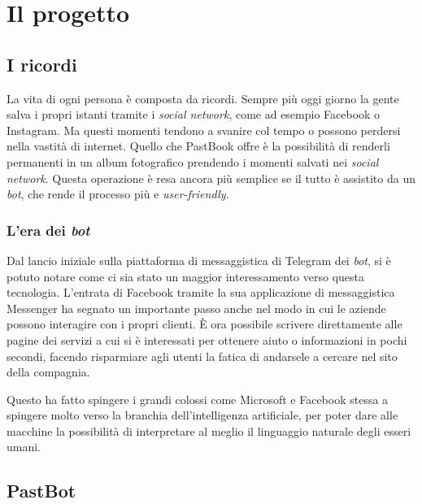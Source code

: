 
\chapter{Il progetto}
\label{cap:progetto}

\section{I ricordi}

La vita di ogni persona è composta da ricordi. Sempre più oggi giorno la gente
salva i propri istanti tramite i \textit{social network}, come ad esempio
Facebook o Instagram. Ma questi momenti tendono a svanire col tempo o possono
perdersi nella vastità di internet. Quello che PastBook offre è la
possibilità di renderli permanenti in un album fotografico prendendo i momenti
salvati nei \textit{social network}. Questa operazione è resa ancora più
semplice se il tutto è assistito da un \textit{bot}, che rende il processo più e
\textit{user-friendly}.

\subsection{L'era dei \textit{bot}}

Dal lancio iniziale sulla piattaforma di messaggistica di Telegram dei
\textit{bot}, si è potuto notare come ci sia stato un maggior interessamento
verso questa tecnologia. L'entrata di Facebook tramite la sua applicazione di
messaggistica Messenger ha segnato un importante passo anche nel modo in cui le
aziende possono interagire con i propri clienti. È ora possibile scrivere
direttamente alle pagine dei servizi a cui si è interessati per ottenere aiuto o
informazioni in pochi secondi, facendo risparmiare agli utenti la fatica di
andarsele a cercare nel sito della compagnia.

Questo ha fatto spingere i grandi colossi come Microsoft e Facebook stessa a
spingere molto verso la branchia dell'intelligenza artificiale, per poter dare
alle macchine la possibilità di interpretare al meglio il linguaggio naturale
degli esseri umani.

\section{PastBot}

